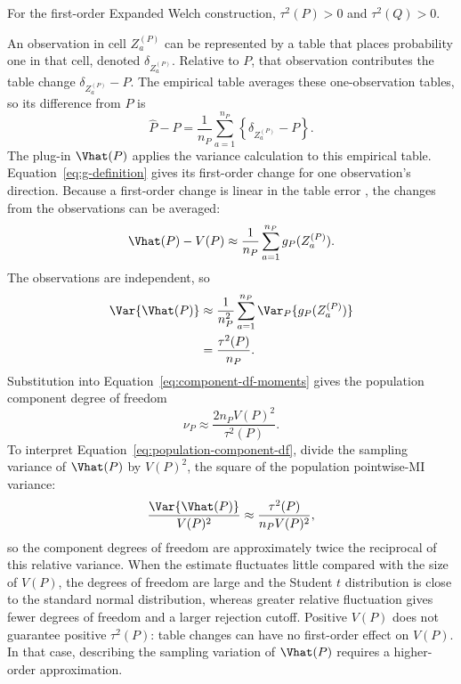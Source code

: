 \begin{assumption}
For the first-order Expanded Welch construction,
\(\tau^2(P)>0\) and \(\tau^2(Q)>0\).
\end{assumption}

An observation in cell \(Z_a^{(P)}\) can be represented by a table that places
probability one in that cell, denoted \(\delta_{Z_a^{(P)}}\). Relative to
\(P\), that observation contributes the table change
\(\delta_{Z_a^{(P)}}-P\). The empirical table averages these one-observation
tables, so its difference from \(P\) is
\begin{equation}
  \widehat P-P
  =\frac{1}{n_P}\sum_{a=1}^{n_P}
  \left\{\delta_{Z_a^{(P)}}-P\right\}.
\end{equation}
The plug-in \(\Vhat(P)\) applies the variance calculation to this empirical
table. Equation~\eqref{eq:g-definition} gives its first-order change for
one observation's direction. Because a first-order change is linear in the
table error \citep[Chapter~20]{vanderVaart1998}, the changes from the
observations can be averaged:
\begin{equation}
  \Vhat(P)-V(P)
  \approx
  \frac{1}{n_P}
  \sum_{a=1}^{n_P}g_P(Z_a^{(P)}).
  \label{eq:vhat-linearization}
\end{equation}
The observations are independent, so
\begin{align}
  \Var\{\Vhat(P)\}
  &\approx
  \frac{1}{n_P^2}
  \sum_{a=1}^{n_P}
  \Var_P\{g_P(Z_a^{(P)})\}\\*
  &=\frac{\tau^2(P)}{n_P}.
  \label{eq:vhat-sampling-variance}
\end{align}
Substitution into Equation~\eqref{eq:component-df-moments} gives the
population component degree of freedom
\begin{equation}
  \boxed{
  \nu_P
  \approx
  \frac{2n_PV(P)^2}{\tau^2(P)}
  }.
  \label{eq:population-component-df}
\end{equation}
To interpret Equation~\eqref{eq:population-component-df}, divide the
sampling variance of \(\Vhat(P)\) by \(V(P)^2\), the square of the
population pointwise-MI variance:
\begin{equation}
  \frac{\Var\{\Vhat(P)\}}{V(P)^2}
  \approx \frac{\tau^2(P)}{n_PV(P)^2},
\end{equation}
so the component degrees of freedom are approximately twice the reciprocal of
this relative variance. When the estimate fluctuates little compared with
the size of \(V(P)\), the degrees of freedom are large and the Student
\(t\) distribution is close to the standard normal distribution, whereas
greater relative fluctuation gives fewer degrees of freedom and a larger rejection
cutoff.
Positive \(V(P)\) does not guarantee positive \(\tau^2(P)\): table changes
can have no first-order effect on \(V(P)\). In that case, describing the
sampling variation of \(\Vhat(P)\) requires a higher-order approximation.

